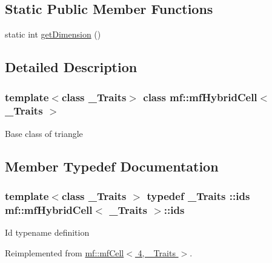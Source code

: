 \subsection*{Static Public Member Functions}
\begin{DoxyCompactItemize}
\item 
static int \hyperlink{classmf_1_1mfHybridCell_a4fb353f76e3fd38febcf2f71c1e11d76}{getDimension} ()
\end{DoxyCompactItemize}


\subsection{Detailed Description}
\subsubsection*{template$<$class \_\-Traits$>$ class mf::mfHybridCell$<$ \_\-Traits $>$}

Base class of triangle 

\subsection{Member Typedef Documentation}
\hypertarget{classmf_1_1mfHybridCell_afcc1603f9fd31f5e82fc0f2175aa74d2}{
\subsubsection[{ids}]{\setlength{\rightskip}{0pt plus 5cm}template$<$class \_\-Traits $>$ typedef \_\-Traits ::{\bf ids} {\bf mf::mfHybridCell}$<$ \_\-Traits $>$::{\bf ids}}}
\label{classmf_1_1mfHybridCell_afcc1603f9fd31f5e82fc0f2175aa74d2}
Id typename definition 

Reimplemented from \hyperlink{classmf_1_1mfCell_a9e32102899fb1e6b5e95b08a6c71063f}{mf::mfCell$<$ 4, \_\-Traits $>$}.



